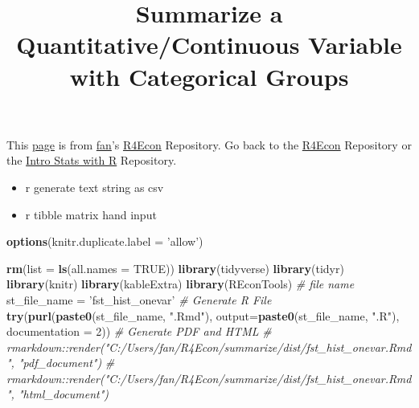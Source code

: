 \documentclass[
]{article}
\title{Summarize a Quantitative/Continuous Variable with Categorical Groups}
\author{}
\date{\vspace{-2.5em}}
\newenvironment{Shaded}{\begin{snugshade}}{\end{snugshade}}
\newcommand{\CommentTok}[1]{\textcolor[rgb]{0.56,0.35,0.01}{\textit{#1}}}
\newcommand{\DataTypeTok}[1]{\textcolor[rgb]{0.13,0.29,0.53}{#1}}
\newcommand{\DecValTok}[1]{\textcolor[rgb]{0.00,0.00,0.81}{#1}}
\newcommand{\KeywordTok}[1]{\textcolor[rgb]{0.13,0.29,0.53}{\textbf{#1}}}
\newcommand{\NormalTok}[1]{#1}
\newcommand{\OtherTok}[1]{\textcolor[rgb]{0.56,0.35,0.01}{#1}}
\newcommand{\StringTok}[1]{\textcolor[rgb]{0.31,0.60,0.02}{#1}}
\providecommand{\tightlist}{%
  \setlength{\itemsep}{0pt}\setlength{\parskip}{0pt}}
\begin{document}
\maketitle

This
\href{https://fanwangecon.github.io/R4Econ/summarize/dist/fst_hist_onevar.html}{page}
is from \href{http://fanwangecon.github.io/CodeDynaAsset/}{fan}'s
\href{https://fanwangecon.github.io/R4Econ/}{R4Econ} Repository. Go back
to the \href{https://fanwangecon.github.io/R4Econ/}{R4Econ} Repository
or the \href{https://fanwangecon.github.io/Stat4Econ/}{Intro Stats with
R} Repository.

\begin{itemize}
\tightlist
\item
  r generate text string as csv
\item
  r tibble matrix hand input
\end{itemize}

\begin{Shaded}
\begin{Highlighting}[]
\KeywordTok{options}\NormalTok{(}\DataTypeTok{knitr.duplicate.label =} \StringTok{'allow'}\NormalTok{)}
\end{Highlighting}
\end{Shaded}

\begin{Shaded}
\begin{Highlighting}[]
\KeywordTok{rm}\NormalTok{(}\DataTypeTok{list =} \KeywordTok{ls}\NormalTok{(}\DataTypeTok{all.names =} \OtherTok{TRUE}\NormalTok{))}
\KeywordTok{library}\NormalTok{(tidyverse)}
\KeywordTok{library}\NormalTok{(tidyr)}
\KeywordTok{library}\NormalTok{(knitr)}
\KeywordTok{library}\NormalTok{(kableExtra)}
\KeywordTok{library}\NormalTok{(REconTools)}
\CommentTok{# file name}
\NormalTok{st_file_name =}\StringTok{ 'fst_hist_onevar'}
\CommentTok{# Generate R File}
\KeywordTok{try}\NormalTok{(}\KeywordTok{purl}\NormalTok{(}\KeywordTok{paste0}\NormalTok{(st_file_name, }\StringTok{".Rmd"}\NormalTok{), }\DataTypeTok{output=}\KeywordTok{paste0}\NormalTok{(st_file_name, }\StringTok{".R"}\NormalTok{), }\DataTypeTok{documentation =} \DecValTok{2}\NormalTok{))}
\CommentTok{# Generate PDF and HTML}
\CommentTok{# rmarkdown::render("C:/Users/fan/R4Econ/summarize/dist/fst_hist_onevar.Rmd", "pdf_document")}
\CommentTok{# rmarkdown::render("C:/Users/fan/R4Econ/summarize/dist/fst_hist_onevar.Rmd", "html_document")}
\end{Highlighting}
\end{Shaded}
\end{document}
